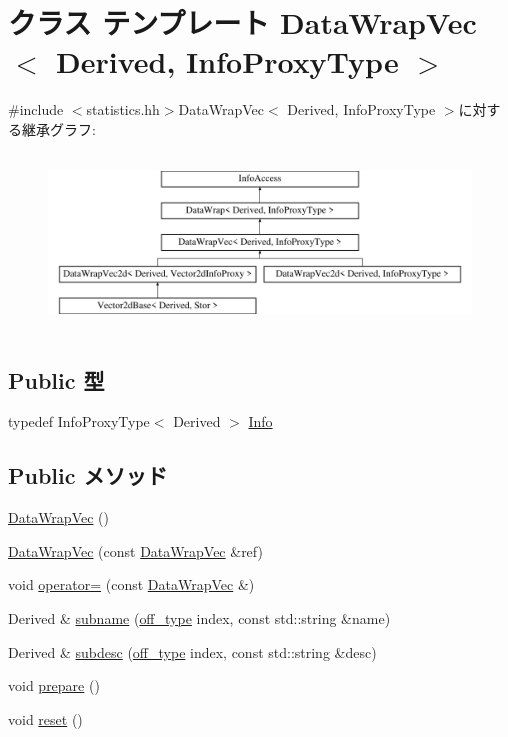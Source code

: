 \hypertarget{classStats_1_1DataWrapVec}{
\section{クラス テンプレート DataWrapVec$<$ Derived, InfoProxyType $>$}
\label{classStats_1_1DataWrapVec}
}


{\ttfamily \#include $<$statistics.hh$>$}DataWrapVec$<$ Derived, InfoProxyType $>$に対する継承グラフ:\begin{figure}[H]
\begin{center}
\leavevmode
\includegraphics[height=4.7138cm]{classStats_1_1DataWrapVec}
\end{center}
\end{figure}
\subsection*{Public 型}
\begin{DoxyCompactItemize}
\item 
typedef InfoProxyType$<$ Derived $>$ \hyperlink{classStats_1_1DataWrapVec_a76d2c248839f34168d2a3760bc1fbdb9}{Info}
\end{DoxyCompactItemize}
\subsection*{Public メソッド}
\begin{DoxyCompactItemize}
\item 
\hyperlink{classStats_1_1DataWrapVec_a3621fa2bcd19b6b7fe5000c990e10706}{DataWrapVec} ()
\item 
\hyperlink{classStats_1_1DataWrapVec_a55303c51e3102bd23db709edf940bd77}{DataWrapVec} (const \hyperlink{classStats_1_1DataWrapVec}{DataWrapVec} \&ref)
\item 
void \hyperlink{classStats_1_1DataWrapVec_ab855679d4219fb17e9dc46c572193966}{operator=} (const \hyperlink{classStats_1_1DataWrapVec}{DataWrapVec} \&)
\item 
Derived \& \hyperlink{classStats_1_1DataWrapVec_a74726d23d92792c7c3cebdaf3bfd23f0}{subname} (\hyperlink{namespaceStats_a2773c9fa9e4b0b04a46b37494b44842a}{off\_\-type} index, const std::string \&name)
\item 
Derived \& \hyperlink{classStats_1_1DataWrapVec_a07022e322c6f68196007ff5a4af1c191}{subdesc} (\hyperlink{namespaceStats_a2773c9fa9e4b0b04a46b37494b44842a}{off\_\-type} index, const std::string \&desc)
\item 
void \hyperlink{classStats_1_1DataWrapVec_a1825b40ca3bc3a1ba67fdb58fac5015c}{prepare} ()
\item 
void \hyperlink{classStats_1_1DataWrapVec_ad20897c5c8bd47f5d4005989bead0e55}{reset} ()
\end{DoxyCompactItemize}
